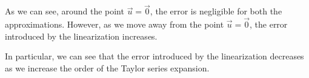 As we can see, around the point $\vec{u} = \vec{0}$, the error is negligible for both the approximations.
However, as we move away from the point $\vec{u} = \vec{0}$, the error introduced by the linearization increases.

In particular, we can see that the error introduced by the linearization decreases as we increase the order of the Taylor series expansion.